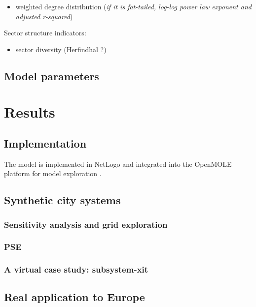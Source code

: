 \documentclass{article}
\begin{document}
\begin{itemize}
    \item weighted degree distribution (\textit{if it is fat-tailed, log-log power law exponent and adjusted r-squared})
\end{itemize}

Sector structure indicators:

\begin{itemize}
    \item sector diversity (Herfindhal ?) 
\end{itemize}


\subsection{Model parameters}



\section{Results}

\subsection{Implementation}



The model is implemented in NetLogo and integrated into the OpenMOLE platform for model exploration \cite{reuillon2013openmole}.

\subsection{Synthetic city systems}

\subsubsection{Sensitivity analysis and grid exploration}


\subsubsection{PSE}


\subsubsection{A virtual case study: subsystem-xit}



\subsection{Real application to Europe}







\end{document}
